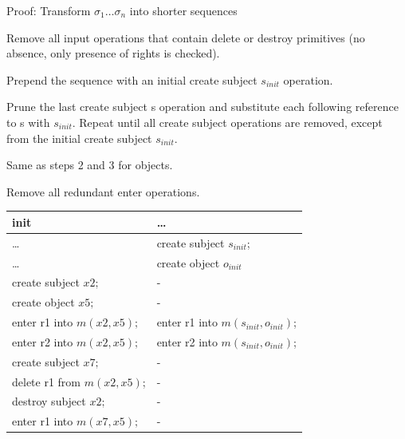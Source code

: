 \documentclass[a4paper]{article}
\begin{document}
\begin{multicols}{3}
    Proof: Transform $\sigma_1\dots \sigma_n$ into shorter sequences
    \begin{enumerate*}
        \item Remove all input operations that contain delete or destroy primitives (no absence, only presence of rights is checked).
        \item Prepend the sequence with an initial create subject $s_{init}$ operation.
        \item Prune the last create subject s operation and substitute each following reference to s with $s_{init}$. Repeat until all create subject operations are removed, except from the initial create subject $s_{init}$.
        \item Same as steps 2 and 3 for objects.
        \item Remove all redundant enter operations.
    \end{enumerate*}

    \begin{tabular}{l|l}
        init                       & \dots                                 \\\hline
        \dots                      & create subject $s_{init}$;            \\
        \dots                      & create object $o_{init}$              \\
        create subject $x2;$       & -                                     \\
        create object $x5;$        & -                                     \\
        enter r1 into $m(x2,x5);$  & enter r1 into $m(s_{init},o_{init})$; \\
        enter r2 into $m(x2,x5);$  & enter r2 into $m(s_{init},o_{init})$; \\
        create subject $x7;$       & -                                     \\
        delete r1 from $m(x2,x5)$; & -                                     \\
        destroy subject $x2;$      & -                                     \\
        enter r1 into $m(x7,x5);$  & -
    \end{tabular}


\end{multicols}
\end{document}
